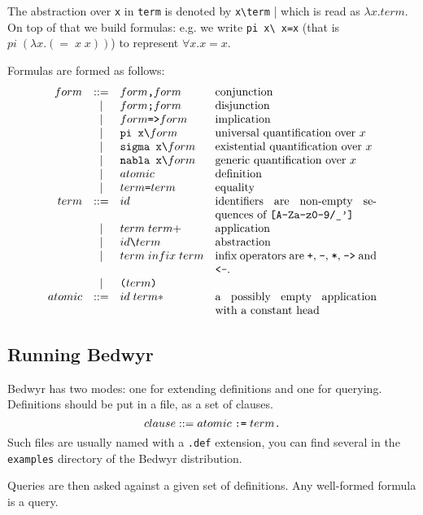 \documentclass{article}
\begin{document}
The abstraction over \verb.x. in \verb.term. is denoted by \verb.x\term. | 
which is read as $\lambda x. term$. On top of that we build 
formulas: e.g. we write \verb.pi x\ x=x.
(that is $pi\;(\lambda{}x.(=\;x\;x))$)
to represent $\forall x. x=x$.

Formulas are formed as follows:
\[\begin{array}{rclp{5cm}}
form &::=& form \texttt{,}  form & conjunction \\
     & | & form \texttt{;}  form & disjunction \\
     & | & form \texttt{=>} form & implication \\
     & | & \verb.pi x\.    form  & universal quantification over $x$ \\
     & | & \verb.sigma x\. form  & existential quantification over $x$ \\
     & | & \verb.nabla x\. form  & generic quantification over $x$ \\
     & | & atomic & definition \\
     & | & term \verb.=. term & equality \\
term &::=& id & identifiers are non-empty sequences of \verb.[A-Za-z0-9/_']. \\
     & | & term \; term+ & application \\
     & | & id \verb.\. term & abstraction \\
     & | & term \; infix \; term & infix operators are
             \verb.+., \verb.-., \verb.*., \verb.->. and \verb.<-.. \\
     & | & \verb.(. term \verb.). & \\
atomic &::=& id \; term* & a possibly empty application with a constant head \\
\end{array}\]

\subsection{Running Bedwyr}

Bedwyr has two modes: one for extending definitions and one for querying.
Definitions should be put in a file, as a set of clauses.
\[ clause ::= atomic \;\verb.:=.\; term \verb|.| \]
Such files are usually named with a \verb|.def| extension, you can find several
in the \verb.examples. directory of the Bedwyr distribution.

Queries are then asked against a given set of definitions.
Any well-formed formula is a query.
\end{document}
